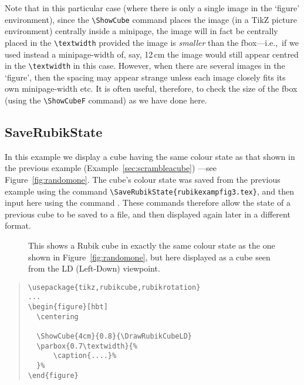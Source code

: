 \documentclass[a4paper]{article}
\begin{document}
Note that in this particular case (where there is only a single image in the 
`figure' environment), since the \verb!\ShowCube! command places the image 
(in a TikZ picture environment) centrally  inside a minipage, the image will 
in fact be centrally placed in  the \verb!\textwidth! provided the image 
is \textit{smaller} than the fbox---i.e.,~if we used instead a minipage-width of, 
say, 12\,cm  the image would still  appear centred in the \verb!\textwidth! in 
this case. However, when there are several images in the `figure', then the spacing 
may appear strange unless each image closely fits its own minipage-width etc.
It is often useful, therefore, to check the size of the fbox (using the 
\verb!\ShowCubeF! command) as we have done here.
   
 
\pagebreak

\subsection{SaveRubikState}
\label{sec:saverubikstate}

In this example we display a cube having the same colour state as that shown in 
the previous example (Example~\ref{sec:scrambleacube}) ---see Figure~\ref{fig:randomone}. 
The cube's colour state was saved from the previous example using the  command 
\verb!\SaveRubikState{rubikexampfig3.tex}!, and then input here  
using the command \verb!!. These commands therefore allow  the 
state of a previous cube to be saved to a file, and then  displayed again 
later in  a different format.

\begin{figure}[hbt]
  \centering
  
\parbox{0.7\textwidth}{%
  \caption{\label{fig:randomtwo} This shows a Rubik cube in exactly the  same 
  colour state as  the one shown in Figure~\ref{fig:randomone}, but here displayed 
  as a cube seen from the LD (Left-Down) viewpoint.}%
}%
\end{figure}

\begin{quote}
\begin{verbatim}
\usepackage{tikz,rubikcube,rubikrotation}
...
\begin{figure}[hbt]
  \centering
  
  \ShowCube{4cm}{0.8}{\DrawRubikCubeLD}
  \parbox{0.7\textwidth}{%
      \caption{....}%
  }%
\end{figure}
\end{verbatim}
\end{quote}
\end{document}
